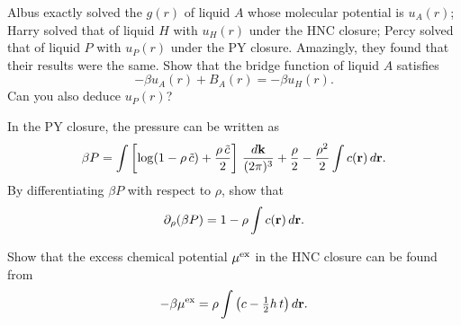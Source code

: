 \documentclass[12pt]{book}
\begin{document}

Albus exactly solved the $g(r)$ of liquid $A$ whose molecular potential is $u_A(r)$;
Harry solved that of liquid $H$ with $u_H(r)$ under the HNC closure;
Percy solved that of liquid $P$ with $u_P(r)$ under the PY closure.
Amazingly, they found that their results were the same.
Show that the bridge function of liquid $A$ satisfies
\begin{equation}
  -\beta u_A(r) + B_A(r) = -\beta u_H(r).
\end{equation}
Can you also deduce $u_P(r)$?




In the PY closure, the pressure can be written as\cite{baxterpressure}
\begin{align}
  \beta P =  \int \left[
    \log(1-\rho \,\tilde{c}) + \frac{ \rho \, \tilde{c} }{2}
  \right] \, \frac{ d \boldsymbol{\mathbf{k}} }{(2\pi)^3}
  +
  \frac{\rho}{2}
  - \frac{\rho^2}{2} \int c(\boldsymbol{\mathbf{r}}) \, d\boldsymbol{\mathbf{r}}.
  \label{eq:Pbaxter}
\end{align}
%
By differentiating $\beta P$ with respect to $\rho$,
show that
\begin{align}
  \partial_\rho (\beta P) = 1 - \rho \int c(\boldsymbol{\mathbf{r}}) \, d\boldsymbol{\mathbf{r}}.
\end{align}





Show that the excess chemical potential ${ { \mu }^{ \mathrm{ex} } }$ in the HNC closure
can be found from\cite{morita1960, singer1985}
\begin{equation}
  -\beta { { \mu }^{ \mathrm{ex} } } = \rho \int \left( c - \tfrac{1}{2} h \, t\right) d\boldsymbol{\mathbf{r}}.
  \label{eq:muexhnc}
\end{equation}
\end{document}
